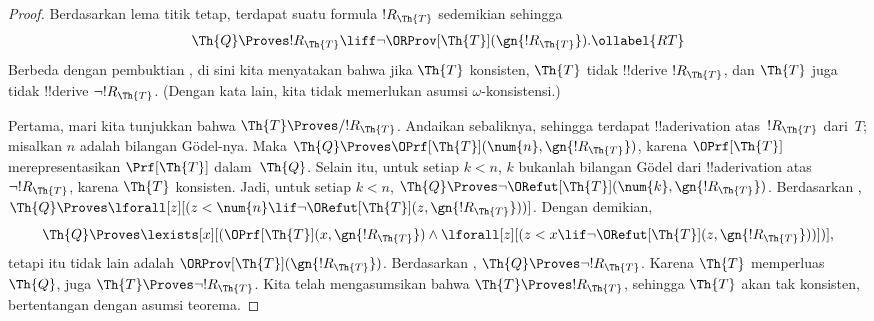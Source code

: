 \documentclass[../../../include/open-logic-section]{subfiles}
\begin{document}
\begin{proof}
Berdasarkan lema titik tetap, terdapat suatu formula $!R_\Th{T}$ sedemikian
sehingga
\begin{equation}
  \Th{Q} \Proves !R_\Th{T} \liff \lnot \ORProv[\Th{T}](\gn{!R_\Th{T}}).
  \ollabel{RT}
\end{equation}
Berbeda dengan pembuktian , di sini kita
menyatakan bahwa jika $\Th{T}$ konsisten, $\Th{T}$ tidak !!{derive}
$!R_\Th{T}$, dan $\Th{T}$ juga tidak !!{derive} $\lnot !R_\Th{T}$. (Dengan
kata lain, kita tidak memerlukan asumsi $\omega$-konsistensi.)

Pertama, mari kita tunjukkan bahwa $\Th{T} \Proves/ !R_{\Th{T}}$. Andaikan
sebaliknya, sehingga terdapat !!a{derivation} atas~$!R_{\Th{T}}$
dari~$T$; misalkan $n$ adalah bilangan G\"odel-nya. Maka
$\Th{Q} \Proves \OPrf[\Th{T}](\num{n},\gn{!R_{\Th{T}}})$, karena
$\OPrf[\Th{T}]$ merepresentasikan $\Prf[\Th{T}]$ dalam~$\Th{Q}$. Selain
itu, untuk setiap $k<n$, $k$ bukanlah bilangan G\"odel dari
!!a{derivation} atas $\lnot !R_{\Th{T}}$, karena $\Th{T}$ konsisten. Jadi,
untuk setiap $k<n$,
$\Th{Q} \Proves \lnot \ORefut[\Th{T}](\num{k},\gn{!R_{\Th{T}}})$.
Berdasarkan ,
$\Th{Q} \Proves \lforall[z][(z < \num{n} \lif \lnot
\ORefut[\Th{T}](z,\gn{!R_{\Th{T}}}))]$. Dengan demikian,
\[
\Th{Q} \Proves \lexists[x][(\OPrf[\Th{T}](x,\gn{!R_{\Th{T}}}) \land
  \lforall[z][(z < x \lif \lnot \ORefut[\Th{T}](z,
  \gn{!R_{\Th{T}}}))])],
\]
tetapi itu tidak lain adalah $\ORProv[\Th{T}](\gn{!R_{\Th{T}}})$.
Berdasarkan , $\Th{Q} \Proves \lnot !R_{\Th{T}}$. Karena
$\Th{T}$ memperluas $\Th{Q}$, juga
$\Th{T} \Proves \lnot !R_{\Th{T}}$. Kita telah mengasumsikan bahwa
$\Th{T} \Proves !R_{\Th{T}}$, sehingga $\Th{T}$ akan tak konsisten,
bertentangan dengan asumsi teorema.


\end{proof}
\end{document}
